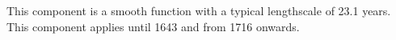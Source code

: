 This component is a smooth function with a typical lengthscale of 23.1 years.
This component applies until 1643 and from 1716 onwards.